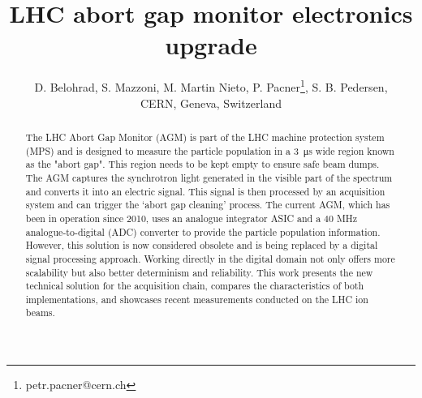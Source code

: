 



\title{LHC abort gap monitor electronics upgrade}

\author{D. Belohrad, S. Mazzoni, M. Martin Nieto, P. Pacner\thanks{petr.pacner@cern.ch}, S. B. Pedersen,\\
CERN, Geneva, Switzerland}
	
\maketitle

\begin{abstract}
    The LHC Abort Gap Monitor (AGM) is part of the LHC machine protection
    system (MPS) and is designed to measure the particle population in a \SI{3}{\micro\second}
    wide region known as the "abort gap". This region needs to be kept empty to
    ensure safe beam dumps. The AGM captures the synchrotron light generated in
    the visible part of the spectrum and converts it into an electric signal.
    This signal is then processed by an acquisition system and can trigger the
    ‘abort gap cleaning’ process. The current AGM, which has been in operation
    since 2010, uses an analogue integrator ASIC and a 40 MHz
    analogue-to-digital (ADC) converter to provide the particle population
    information. However, this solution is now considered obsolete and is being
    replaced by a digital signal processing approach. Working directly in the
    digital domain not only offers more scalability but also better determinism
    and reliability. This work presents the new technical solution for the
    acquisition chain, compares the characteristics of both implementations,
    and showcases recent measurements conducted on the LHC ion beams.
\end{abstract}

